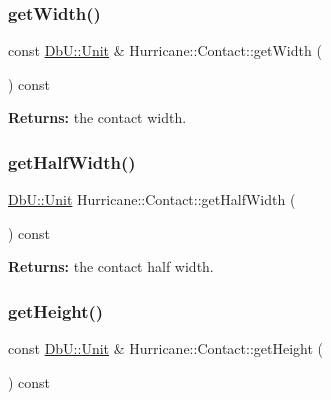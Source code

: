 \subsubsection{\texorpdfstring{get\+Width()}{getWidth()}}
{\footnotesize\ttfamily const \mbox{\hyperlink{group__DbUGroup_ga4fbfa3e8c89347af76c9628ea06c4146}{Db\+U\+::\+Unit}} \& Hurricane\+::\+Contact\+::get\+Width (\begin{DoxyParamCaption}{ }\end{DoxyParamCaption}) const\hspace{0.3cm}{\ttfamily [inline]}}

{\bfseries Returns\+:} the contact width. \mbox{\label{classHurricane_1_1Contact_a4a5136f4e8299435e50db7da28172ca1}} 
\subsubsection{\texorpdfstring{get\+Half\+Width()}{getHalfWidth()}}
{\footnotesize\ttfamily \mbox{\hyperlink{group__DbUGroup_ga4fbfa3e8c89347af76c9628ea06c4146}{Db\+U\+::\+Unit}} Hurricane\+::\+Contact\+::get\+Half\+Width (\begin{DoxyParamCaption}{ }\end{DoxyParamCaption}) const\hspace{0.3cm}{\ttfamily [inline]}}

{\bfseries Returns\+:} the contact half width. \mbox{\label{classHurricane_1_1Contact_adf6487485a4f48bd15aa6f9a8ac5fd27}} 
\subsubsection{\texorpdfstring{get\+Height()}{getHeight()}}
{\footnotesize\ttfamily const \mbox{\hyperlink{group__DbUGroup_ga4fbfa3e8c89347af76c9628ea06c4146}{Db\+U\+::\+Unit}} \& Hurricane\+::\+Contact\+::get\+Height (\begin{DoxyParamCaption}{ }\end{DoxyParamCaption}) const\hspace{0.3cm}{\ttfamily [inline]}}

